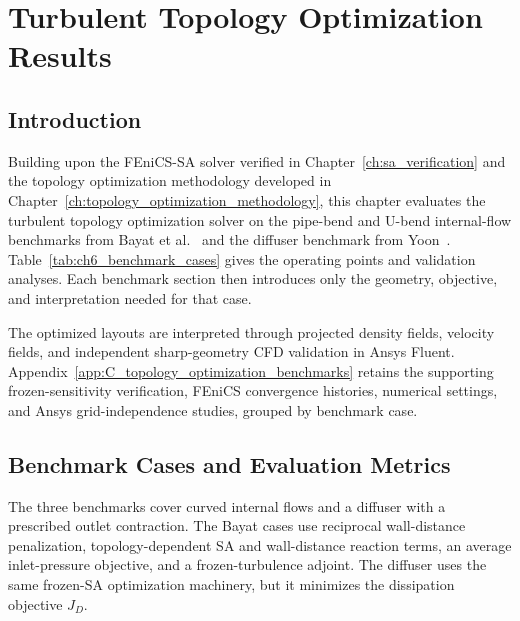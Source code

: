 \chapter{Turbulent Topology Optimization Results}
\label{ch:benchmark_results}

\section{Introduction}
\label{sec:ch6_introduction}
Building upon the FEniCS-SA solver verified in Chapter~\ref{ch:sa_verification} and the topology optimization methodology developed in Chapter~\ref{ch:topology_optimization_methodology}, this chapter evaluates the turbulent topology optimization solver on the pipe-bend and U-bend internal-flow benchmarks from Bayat et al.~\cite{Bayat2026} and the diffuser benchmark from Yoon~\cite{Yoon2016}. Table~\ref{tab:ch6_benchmark_cases} gives the operating points and validation analyses. Each benchmark section then introduces only the geometry, objective, and interpretation needed for that case.

The optimized layouts are interpreted through projected density fields, velocity fields, and independent sharp-geometry CFD validation in Ansys Fluent. Appendix~\ref{app:C_topology_optimization_benchmarks} retains the supporting frozen-sensitivity verification, FEniCS convergence histories, numerical settings, and Ansys grid-independence studies, grouped by benchmark case.

\section{Benchmark Cases and Evaluation Metrics}
\label{sec:ch6_strategy_metrics}

The three benchmarks cover curved internal flows and a diffuser with a prescribed outlet contraction. The Bayat cases use reciprocal wall-distance penalization, topology-dependent SA and wall-distance reaction terms, an average inlet-pressure objective, and a frozen-turbulence adjoint. The diffuser uses the same frozen-SA optimization machinery, but it minimizes the dissipation objective $J_D$.

